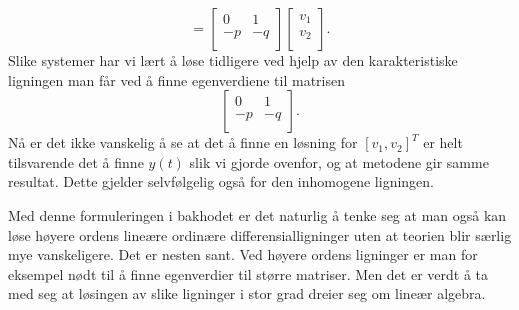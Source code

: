 \documentclass{article}
\theoremstyle{definition}
\theoremstyle{remark}
\begin{document}
\begin{multicols*}{2}
\begin{equation*}
  =
  \begin{bmatrix}
    0 & 1 \\
    -p & -q \\
  \end{bmatrix}
  \begin{bmatrix}
    v_1 \\
    v_2 \\
  \end{bmatrix}.
\end{equation*}
Slike systemer har vi lært å løse tidligere ved hjelp av den karakteristiske ligningen man får ved å finne egenverdiene til matrisen
\begin{equation*}
  \begin{bmatrix}
    0 & 1 \\
    -p & -q \\
  \end{bmatrix}.
\end{equation*}
Nå er det ikke vanskelig å se at det å finne en løsning for $[v_1, v_2]^{T}$ er helt tilsvarende det å finne $y(t)$ slik vi gjorde ovenfor, og at metodene gir samme resultat. Dette gjelder selvfølgelig også for den inhomogene ligningen.

Med denne formuleringen i bakhodet er det naturlig å tenke seg at man også kan løse høyere ordens lineære ordinære differensialligninger uten at teorien blir særlig mye vanskeligere. Det er nesten sant. Ved høyere ordens ligninger er man for eksempel nødt til å finne egenverdier til større matriser. Men det er verdt å ta med seg at løsingen av slike ligninger i stor grad dreier seg om lineær algebra.

\end{multicols*}
\end{document}
